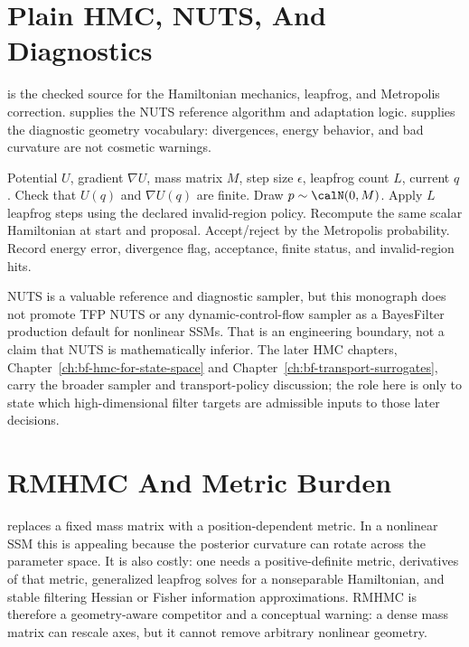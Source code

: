 \section{Plain HMC, NUTS, And Diagnostics}
\label{sec:bf-hd-hmc-diagnostics}

\citet{neal2011mcmc} is the checked source for the Hamiltonian mechanics,
leapfrog, and Metropolis correction.  \citet{hoffman2014nuts} supplies the NUTS
reference algorithm and adaptation logic.  \citet{betancourt2017conceptual}
supplies the diagnostic geometry vocabulary: divergences, energy behavior, and
bad curvature are not cosmetic warnings.

\begin{algorithm}
\caption{Fixed-trajectory HMC diagnostic kernel}
\label{alg:bf-hd-fixed-hmc}
\begin{algorithmic}[1]
\Require Potential $U$, gradient $\nabla U$, mass matrix $M$, step size
  $\epsilon$, leapfrog count $L$, current $q$.
\State Check that $U(q)$ and $\nabla U(q)$ are finite.
\State Draw $p\sim\calN(0,M)$.
\State Apply $L$ leapfrog steps using the declared invalid-region policy.
\State Recompute the same scalar Hamiltonian at start and proposal.
\State Accept/reject by the Metropolis probability.
\State Record energy error, divergence flag, acceptance, finite status, and
  invalid-region hits.
\end{algorithmic}
\end{algorithm}

NUTS is a valuable reference and diagnostic sampler, but this monograph does
not promote TFP NUTS or any dynamic-control-flow sampler as a BayesFilter
production default for nonlinear SSMs.  That is an engineering boundary, not a
claim that NUTS is mathematically inferior.  The later HMC chapters,
Chapter~\ref{ch:bf-hmc-for-state-space} and
Chapter~\ref{ch:bf-transport-surrogates}, carry the broader sampler and
transport-policy discussion; the role here is only to state which high-dimensional
filter targets are admissible inputs to those later decisions.

\section{RMHMC And Metric Burden}
\label{sec:bf-hd-rmhmc}

\citet{girolami2011riemann} replaces a fixed mass matrix with a
position-dependent metric.  In a nonlinear SSM this is appealing because the
posterior curvature can rotate across the parameter space.  It is also costly:
one needs a positive-definite metric, derivatives of that metric, generalized
leapfrog solves for a nonseparable Hamiltonian, and stable filtering Hessian or
Fisher information approximations.  RMHMC is therefore a geometry-aware
competitor and a conceptual warning: a dense mass matrix can rescale axes, but
it cannot remove arbitrary nonlinear geometry.

